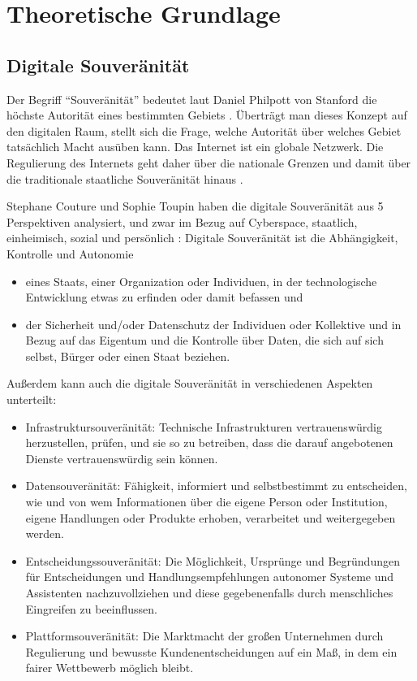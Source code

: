 \chapter{Theoretische Grundlage}
\label{ch:theorie}
\section{Digitale Souveränität}
Der Begriff ``Souveränität'' bedeutet laut Daniel Philpott von Stanford die höchste Autorität eines bestimmten Gebiets \cite{sep-sovereignty}. 
Überträgt man dieses Konzept auf den digitalen Raum, stellt sich die Frage, welche Autorität über welches Gebiet tatsächlich Macht ausüben kann.
Das Internet ist ein globale Netzwerk. 
Die Regulierung des Internets geht daher über die nationale Grenzen und damit über die traditionale staatliche Souveränität hinaus \cite{Barlow1996Independence}. 

Stephane Couture und Sophie Toupin haben die digitale Souveränität aus 5 Perspektiven analysiert, und zwar im Bezug auf Cyberspace, 
staatlich, einheimisch, sozial und persönlich \cite{Couture:2019}: Digitale Souveränität ist die Abhängigkeit, Kontrolle und Autonomie 
\begin{itemize}
\item eines Staats, einer Organization oder Individuen, in der technologische Entwicklung etwas zu erfinden oder damit befassen und 
\item der Sicherheit und/oder Datenschutz der Individuen oder Kollektive und in Bezug auf das Eigentum und die Kontrolle über Daten, die sich auf sich selbst, Bürger oder 
einen Staat beziehen. 
\end{itemize}
Außerdem kann auch die digitale Souveränität in verschiedenen Aspekten unterteilt\cite{BeyererMQuadeReussner2018}: 
\begin{itemize}
    \item Infra\-struk\-tur\-sou\-ver\-ä\-ni\-tät: Technische Infrastrukturen vertrauenswürdig herzustellen, 
    prüfen, und sie so zu betreiben, dass die darauf angebotenen Dienste 
    vertrauenswürdig sein können.
    \item Datensouveränität: Fähigkeit, informiert und selbstbestimmt zu entscheiden, 
    wie und von wem Informationen über die eigene Person oder Institution, eigene 
    Handlungen oder Produkte erhoben, verarbeitet und weitergegeben werden.
    \item Entscheidungssouveränität: Die Möglichkeit, Ursprünge und Begründungen für 
    Entscheidungen und Handlungsempfehlungen autonomer Systeme und Assistenten nachzuvollziehen
    und diese gegebenenfalls durch menschliches Eingreifen zu beeinflussen.
    \item Platt\-form\-sou\-ver\-ä\-ni\-tät: Die Markt\-macht der gro\-ßen Unternehmen durch Regulierung und 
    bewusste Kundenentscheidungen auf ein Maß, in dem ein fairer Wettbewerb möglich bleibt.
\end{itemize}

